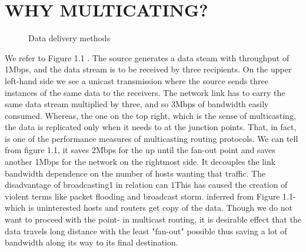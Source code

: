 \documentclass[11pt,left=2cm,bottom=2cm,oneside]{book}
\begin{document}
\section{WHY MULTICATING?}
\begin{flushleft}\begin{figure}[H]\caption{Data delivery methods}\end{figure}\end{flushleft}
We refer to Figure 1.1 . The source generates a data steam with throughput
of 1Mbps, and the data stream is to be received by three recipients. On the upper
left-hand side we see a unicast transmission where the source sends three instances
of the same data to the receivers. The network link has to carry the same data
stream multiplied by three, and so 3Mbps of bandwidth easily consumed. Whereas,
the one on the top right, which is the sense of multicasting, the data is replicated
only when it needs to at the junction points. That, in fact, is one of the performance
measures of multicasting routing protocols. We can tell from figure 1.1, it saves
2Mbps for the up until the fan-out point and saves another 1Mbps for the network
on the rightmost side. It decouples the link bandwidth dependence on the number
of hosts wanting that traffic. The disadvantage of broadcasting1 in relation can
1This has caused the creation of violent terms like packet ﬂooding and broadcast storm.
inferred from Figure 1.1- which is uninterested hosts and routers get copy of the
data. Though we do not want to proceed with the point- in multicast routing, it is
desirable effect that the data travels long distance with the least "fan-out" possible
thus saving a lot of bandwidth along its way to its final destination.
\end{document}
